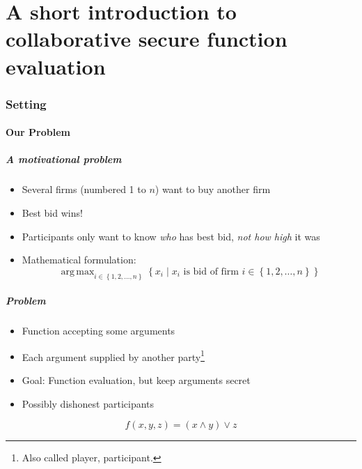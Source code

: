 \documentclass{beamer}
\DeclareMathOperator*{\argmax}{arg\,max}
\begin{document}
\part{A short introduction to collaborative secure function evaluation}
\label{part:mainpart}

\section{Setting}
\label{sec:setting}

\subsection{Our Problem}

\begin{frame}
  \frametitle{A motivational problem}  
  \begin{itemize}
  \item Several firms (numbered 1 to $n$) want to buy another firm
  \item Best bid wins!
  \item Participants only want to know \emph{who} has best bid, \emph{not how high} it was
  \item Mathematical formulation: 
    \begin{equation*}
      \argmax_{i\in\left\{ 1,2,\dots,n \right\}} \left\{ x_i \mid x_i \text{ is bid of firm } i \in \left\{ 1,2,\dots,n \right\} \right\}
    \end{equation*}

  \end{itemize}
\end{frame}

\begin{frame}
  \frametitle{Problem}  
  \begin{itemize}
  \item Function accepting some arguments
  \item Each argument supplied by another party\footnote{Also called player, participant.}
  \item Goal: Function evaluation, but keep arguments secret
  \item Possibly dishonest participants
  \end{itemize}
  \begin{example}
    \begin{equation}
      \label{eq:example-function}
      f(x,y,z) = (x\wedge y)\vee z
    \end{equation}
  \end{example}
\end{frame}
\end{document}
